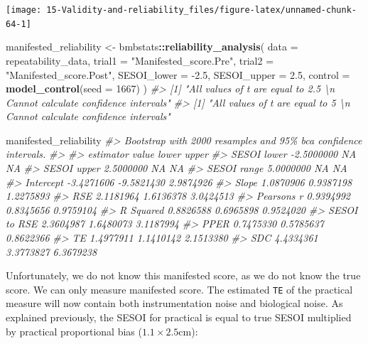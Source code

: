 \documentclass[
]{book}
\newenvironment{Shaded}{\begin{snugshade}}{\end{snugshade}}
\newcommand{\CommentTok}[1]{\textcolor[rgb]{0.56,0.35,0.01}{\textit{#1}}}
\newcommand{\DataTypeTok}[1]{\textcolor[rgb]{0.13,0.29,0.53}{#1}}
\newcommand{\DecValTok}[1]{\textcolor[rgb]{0.00,0.00,0.81}{#1}}
\newcommand{\FloatTok}[1]{\textcolor[rgb]{0.00,0.00,0.81}{#1}}
\newcommand{\KeywordTok}[1]{\textcolor[rgb]{0.13,0.29,0.53}{\textbf{#1}}}
\newcommand{\NormalTok}[1]{#1}
\newcommand{\OperatorTok}[1]{\textcolor[rgb]{0.81,0.36,0.00}{\textbf{#1}}}
\newcommand{\StringTok}[1]{\textcolor[rgb]{0.31,0.60,0.02}{#1}}
\begin{document}
\begin{center}\texttt{[image: 15-Validity-and-reliability\_files/figure-latex/unnamed-chunk-64-1]} \end{center}

\begin{Shaded}
\begin{Highlighting}[]
\NormalTok{manifested\_reliability <{-}}\StringTok{ }\NormalTok{bmbstats}\OperatorTok{::}\KeywordTok{reliability\_analysis}\NormalTok{(}
  \DataTypeTok{data =}\NormalTok{ repeatability\_data,}
  \DataTypeTok{trial1 =} \StringTok{"Manifested\_score.Pre"}\NormalTok{,}
  \DataTypeTok{trial2 =} \StringTok{"Manifested\_score.Post"}\NormalTok{,}
  \DataTypeTok{SESOI\_lower =} \FloatTok{{-}2.5}\NormalTok{,}
  \DataTypeTok{SESOI\_upper =} \FloatTok{2.5}\NormalTok{,}
  \DataTypeTok{control =} \KeywordTok{model\_control}\NormalTok{(}\DataTypeTok{seed =} \DecValTok{1667}\NormalTok{)}
\NormalTok{)}
\CommentTok{\#> [1] "All values of t are equal to  2.5 \textbackslash{}n Cannot calculate confidence intervals"}
\CommentTok{\#> [1] "All values of t are equal to  5 \textbackslash{}n Cannot calculate confidence intervals"}

\NormalTok{manifested\_reliability}
\CommentTok{\#> Bootstrap with 2000 resamples and 95\% bca confidence intervals.}
\CommentTok{\#> }
\CommentTok{\#>     estimator      value      lower     upper}
\CommentTok{\#>   SESOI lower {-}2.5000000         NA        NA}
\CommentTok{\#>   SESOI upper  2.5000000         NA        NA}
\CommentTok{\#>   SESOI range  5.0000000         NA        NA}
\CommentTok{\#>     Intercept {-}3.4271606 {-}9.5821430 2.9874926}
\CommentTok{\#>         Slope  1.0870906  0.9387198 1.2275893}
\CommentTok{\#>           RSE  2.1181964  1.6136378 3.0424513}
\CommentTok{\#>   Pearson\textquotesingle{}s r  0.9394992  0.8345656 0.9759104}
\CommentTok{\#>     R Squared  0.8826588  0.6965898 0.9524020}
\CommentTok{\#>  SESOI to RSE  2.3604987  1.6480073 3.1187994}
\CommentTok{\#>          PPER  0.7475330  0.5785637 0.8622366}
\CommentTok{\#>            TE  1.4977911  1.1410142 2.1513380}
\CommentTok{\#>           SDC  4.4334361  3.3773827 6.3679238}
\end{Highlighting}
\end{Shaded}

Unfortunately, we do not know this manifested score, as we do not know the true score. We can only measure manifested score. The estimated \texttt{TE} of the practical measure will now contain both instrumentation noise and biological noise. As explained previously, the SESOI for practical is equal to true SESOI multiplied by practical proportional bias (\(1.1 \times 2.5\)cm):
\end{document}
